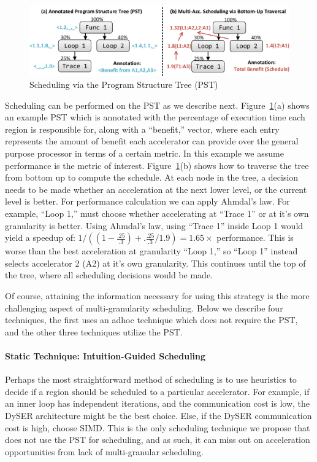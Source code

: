 \begin{figure}
  \begin{center}
    \includegraphics[width=\linewidth]{figs/pst.pdf}
  \end{center}
  \caption{Scheduling via the Program Structure Tree (PST)}
  \label{fig:pst}
\end{figure}

Scheduling can be performed on the PST as we describe next.
Figure~\ref{fig:pst}(a) shows an example PST which is annotated with the
percentage of execution time each region is responsible for, along with a
``benefit,'' vector, where each entry represents the amount of benefit each
accelerator can provide over the general purpose processor in terms of a
certain metric.  In this example we assume performance is the metric of
interest.  Figure~\ref{fig:pst}(b) shows how to traverse the tree from bottom
up to compute the schedule.  At each node in the tree, a decision needs to be
made whether an acceleration at the next lower level, or the current level is
better.  For performance calculation we can apply Ahmdal's law.
For example, ``Loop 1,'' must choose whether accelerating at ``Trace 1'' or at
it's own granularity is better.  Using Ahmdal's law, using ``Trace 1'' inside
Loop 1 would yield a speedup of: $1 / ( (1-\frac{.25}{.3})+.\frac{.25}{.3}/1.9)
= 1.65\times$ performance.  This is worse than the best acceleration at
granularity ``Loop 1,'' so ``Loop 1'' instead selects accelerator 2 (A2) at
it's own granularity.  This continues until the top of the tree, where all
scheduling decisions would be made.

Of course, attaining the information necessary for using this strategy is the
more challenging aspect of multi-granularity scheduling.  Below we describe
four techniques, the first uses an adhoc technique which does not require the
PST, and the other three techniques utilize the PST.


\paragraph{Static Technique: Intuition-Guided Scheduling} Perhaps the most straightforward
method of scheduling is to use heuristics to decide if a region should be
scheduled to a particular accelerator.  For example, if an inner loop has 
independent iterations, and the communication cost is low, the DySER architecture
might be the best choice.  Else, if the DySER communication cost is high, choose
SIMD.  This is the only scheduling technique we propose that does not use the PST
for scheduling, and as such, it can miss out on acceleration opportunities from
lack of multi-granular scheduling.

